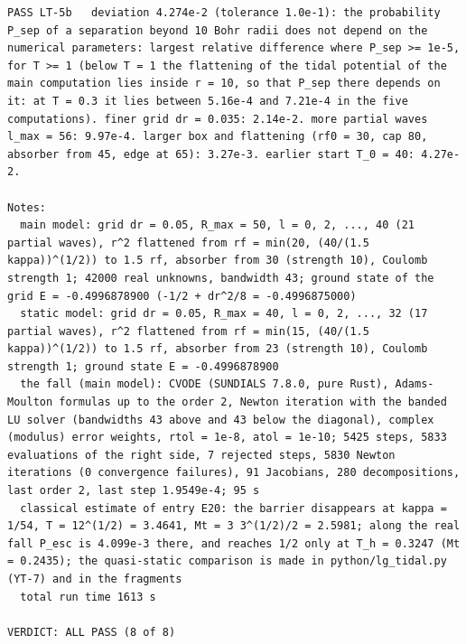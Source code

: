\documentclass[
  10pt,
]{article}
\begin{document}
\begin{verbatim}
PASS LT-5b   deviation 4.274e-2 (tolerance 1.0e-1): the probability P_sep of a separation beyond 10 Bohr radii does not depend on the numerical parameters: largest relative difference where P_sep >= 1e-5, for T >= 1 (below T = 1 the flattening of the tidal potential of the main computation lies inside r = 10, so that P_sep there depends on it: at T = 0.3 it lies between 5.16e-4 and 7.21e-4 in the five computations). finer grid dr = 0.035: 2.14e-2. more partial waves l_max = 56: 9.97e-4. larger box and flattening (rf0 = 30, cap 80, absorber from 45, edge at 65): 3.27e-3. earlier start T_0 = 40: 4.27e-2. 

Notes:
  main model: grid dr = 0.05, R_max = 50, l = 0, 2, ..., 40 (21 partial waves), r^2 flattened from rf = min(20, (40/(1.5 kappa))^(1/2)) to 1.5 rf, absorber from 30 (strength 10), Coulomb strength 1; 42000 real unknowns, bandwidth 43; ground state of the grid E = -0.4996878900 (-1/2 + dr^2/8 = -0.4996875000)
  static model: grid dr = 0.05, R_max = 40, l = 0, 2, ..., 32 (17 partial waves), r^2 flattened from rf = min(15, (40/(1.5 kappa))^(1/2)) to 1.5 rf, absorber from 23 (strength 10), Coulomb strength 1; ground state E = -0.4996878900
  the fall (main model): CVODE (SUNDIALS 7.8.0, pure Rust), Adams-Moulton formulas up to the order 2, Newton iteration with the banded LU solver (bandwidths 43 above and 43 below the diagonal), complex (modulus) error weights, rtol = 1e-8, atol = 1e-10; 5425 steps, 5833 evaluations of the right side, 7 rejected steps, 5830 Newton iterations (0 convergence failures), 91 Jacobians, 280 decompositions, last order 2, last step 1.9549e-4; 95 s
  classical estimate of entry E20: the barrier disappears at kappa = 1/54, T = 12^(1/2) = 3.4641, Mt = 3 3^(1/2)/2 = 2.5981; along the real fall P_esc is 4.099e-3 there, and reaches 1/2 only at T_h = 0.3247 (Mt = 0.2435); the quasi-static comparison is made in python/lg_tidal.py (YT-7) and in the fragments
  total run time 1613 s

VERDICT: ALL PASS (8 of 8)
\end{verbatim}
\end{document}
